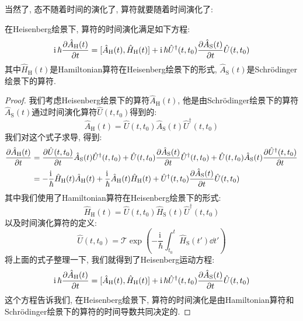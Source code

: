 当然了, 态不随着时间的演化了, 算符就要随着时间演化了:
\begin{theorem}[][Heisenberg运动方程]
  在Heisenberg绘景下, 算符的时间演化满足如下方程:
  \begin{equation}
    \mathrm{i}\, \hbar \pdv{\hat{A}_{\text{H}}(t)}{t} = [\hat{A}_{\text{H}}(t), \hat{H}_{\text{H}}(t)] + \mathrm{i}\,\hbar \hat{U}^\dagger(t,t_0) \pdv{\hat{A}_{\text{S}}(t)}{t} \hat{U}(t,t_0)
  \end{equation}
  其中$\hat{H}_{\text{H}}(t)$是Hamiltonian算符在Heisenberg绘景下的形式, $\hat{A}_{\text{S}}(t)$是Schrödinger绘景下的算符.
\end{theorem}
\begin{proof}
  我们考虑Heisenberg绘景下的算符$\hat{A}_{\text{H}}(t)$, 他是由Schrödinger绘景下的算符$\hat{A}_{\text{S}}(t)$通过时间演化算符$\hat{U}(t,t_0)$得到的:
  \begin{equation}
    \hat{A}_{\text{H}}(t) = \hat{U}(t,t_0) \hat{A}_{\text{S}}(t) \hat{U}^\dagger(t,t_0)
  \end{equation}
  我们对这个式子求导, 得到:
  \begin{align}
    \pdv{\hat{A}_{\text{H}}(t)}{t} &= \pdv{\hat{U}(t,t_0)}{t} \hat{A}_{\text{S}}(t) \hat{U}^\dagger(t,t_0) + \hat{U}(t,t_0) \pdv{\hat{A}_{\text{S}}(t)}{t} \hat{U}^\dagger(t,t_0) + \hat{U}(t,t_0) \hat{A}_{\text{S}}(t) \pdv{\hat{U}^\dagger(t,t_0)}{t} \\
    &= -\frac{\mathrm{i}\,}{\hbar} \hat{H}_{\text{H}}(t) \hat{A}_{\text{H}}(t) + \frac{\mathrm{i}\,}{\hbar} \hat{A}_{\text{H}}(t) \hat{H}_{\text{H}}(t) + \hat{U}^\dagger(t,t_0) \pdv{\hat{A}_{\text{S}}(t)}{t} \hat{U}(t,t_0)
  \end{align}
  其中我们使用了Hamiltonian算符在Heisenberg绘景下的形式:
  \begin{equation}
    \hat{H}_{\text{H}}(t) = \hat{U}(t,t_0) \hat{H}_{\text{S}}(t) \hat{U}^\dagger(t,t_0)
  \end{equation}
  以及时间演化算符的定义:
  \begin{equation}
    \hat{U}(t,t_0) = \mathcal{T} \exp\left( -\frac{\mathrm{i}\,}{\hbar} \int_{t_0}^{t} \hat{H}_{\text{S}}(t') \dd{t'} \right)
  \end{equation}
  将上面的式子整理一下, 我们就得到了Heisenberg运动方程:
  \begin{equation}
    \mathrm{i}\, \hbar \pdv{\hat{A}_{\text{H}}(t)}{t} = [\hat{A}_{\text{H}}(t), \hat{H}_{\text{H}}(t)] + \mathrm{i}\,\hbar \hat{U}^\dagger(t,t_0) \pdv{\hat{A}_{\text{S}}(t)}{t} \hat{U}(t,t_0)
  \end{equation}
  这个方程告诉我们, 在Heisenberg绘景下, 算符的时间演化是由Hamiltonian算符和Schrödinger绘景下的算符的时间导数共同决定的.
\end{proof}


